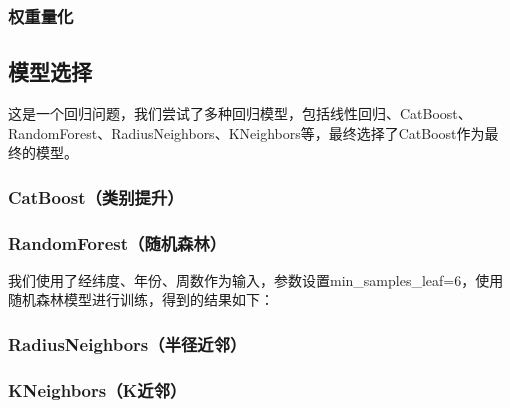 \documentclass{ctexart}
\begin{document}
\subsubsection{权重量化}

\subsection{模型选择}

这是一个回归问题，我们尝试了多种回归模型，包括线性回归、CatBoost、RandomForest、RadiusNeighbors、KNeighbors等，最终选择了CatBoost作为最终的模型。


\subsubsection{CatBoost（类别提升）}

\subsubsection{RandomForest（随机森林）}

我们使用了经纬度、年份、周数作为输入，参数设置min\_samples\_leaf=6，使用随机森林模型进行训练，得到的结果如下：

\subsubsection{RadiusNeighbors（半径近邻）}

\subsubsection{KNeighbors（K近邻）}



\end{document}
